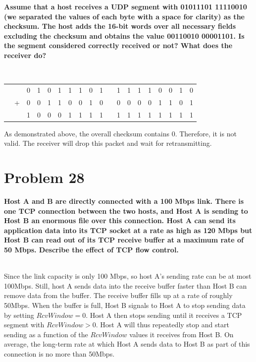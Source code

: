 \documentclass[11pt]{article}
\begin{document}
\textbf{Assume that a host receives a UDP segment with 01011101 11110010 (we separated the values of each byte with a space for clarity) as the checksum. The host adds the 16-bit words over all necessary fields excluding the checksum and obtains the value 00110010 00001101. Is the segment considered correctly received or not? What does the receiver do?}

~\\

 
\begin{center} 
\begin{tabular}{ccccccccccccccccccc}
	&  & 0&1&0&1&1&1&0&1 & &1&1&1&1&0&0&1&0 \\
	&+& 0&0&1&1&0&0&1&0 & &0&0&0&0&1&1&0&1 \\
	\hline
	&  & 1&0&0&0&1&1&1&1 & &1&1&1&1&1&1&1&1 \\
\end{tabular}
\end{center}

As demonstrated above, the overall checksum contains 0. Therefore, it is not valid. The receiver will drop this packet and wait for retransmitting.




\newpage
\section{Problem 28}

\textbf{Host A and B are directly connected with a 100 Mbps link. There is one TCP connection between the two hosts, and Host A is sending to Host B an enormous file over this connection. Host A can send its application data into its TCP socket at a rate as high as 120 Mbps but Host B can read out of its TCP receive buffer at a maximum rate of 50 Mbps. Describe the effect of TCP flow control.}

~\\

Since the link capacity is only 100 Mbps, so host A’s sending rate can be at most 100Mbps. Still, host A sends data into the receive buffer faster than Host B can remove data from the buffer. The receive buffer fills up at a rate of roughly 50Mbps. When the buffer is full, Host B signals to Host A to stop sending data by setting $RcvWindow = 0$. Host A then stops sending until it receives a TCP segment with $RcvWindow > 0$. Host A will thus repeatedly stop and start sending as a function of the $RcvWindow$ values it receives from Host B. On average, the long-term rate at which Host A sends data to Host B as part of this connection is no more than 50Mbps.
\end{document}
